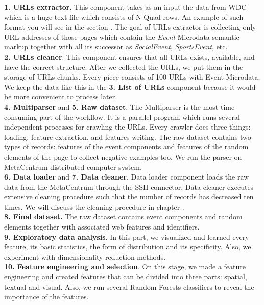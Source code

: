 \textbf{1. URLs extractor}. This component takes as an input the data from WDC which is a huge text file which consists of N-Quad rows. An example of such format you will see in the section . The goal of URLs extractor is collecting only URL addresses of those pages which contain the \textit{Event} Microdata semantic markup together with all its successor as \textit{SocialEvent}, \textit{SportsEvent}, etc.\\

\textbf{2. URLs cleaner}. This component ensures that all URLs exists, available, and have the correct structure. After we collected the URLs, we put them in the storage of URLs chunks. Every piece consists of 100 URLs with Event Microdata. We keep the data like this in the \textbf{3. List of URLs} component because it would be more convenient to process later.\\

\textbf{4. Multiparser} and \textbf{5. Raw dataset}. The Multiparser is the most time-consuming part of the workflow. It is a parallel program which runs several independent processes for crawling the URLs. Every crawler does three things: loading, feature extraction, and features writing. The raw dataset contains two types of records: features of the event components and features of the random elements of the page to collect negative examples too. We run the parser on MetaCentrum distributed computer system.\\

\textbf{6. Data loader} and \textbf{7. Data cleaner}. Data loader component loads the raw data from the MetaCentrum through the SSH connector.  Data cleaner executes extensive cleaning procedure such that the number of records has decreased ten times. We will discuss the cleaning procedure in chapter .\\

\textbf{8. Final dataset.} The raw dataset contains event components and random elements together with associated web features and identifiers.\\

\textbf{9. Exploratory data analysis}. In this part, we visualized and learned every feature, its basic statistics, the form of distribution and its specificity. Also, we experiment with dimensionality reduction methods.  \\

\textbf{10. Feature engineering and selection}. On this stage, we made a feature engineering and created features that can be divided into three parts: spatial, textual and visual. Also, we run several Random Forests classifiers to reveal the importance of the features.\\

